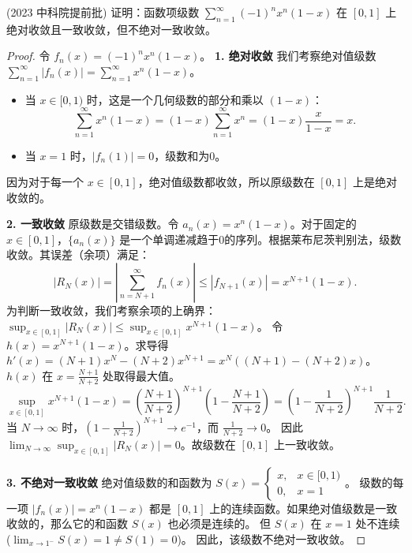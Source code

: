 \documentclass[lang=cn,10pt,thmcnt=section]{elegantbook}
\begin{document}
	
	\begin{example}
	(2023 中科院提前批) 证明：函数项级数 $\sum_{n=1}^{\infty} (-1)^n x^n (1-x)$ 在 $[0,1]$ 上绝对收敛且一致收敛，但不绝对一致收敛。
	\end{example}
	\begin{proof}
		令 $f_n(x) = (-1)^n x^n (1-x)$。
		\textbf{1. 绝对收敛}
		我们考察绝对值级数 $\sum_{n=1}^\infty |f_n(x)| = \sum_{n=1}^\infty x^n(1-x)$。
		\begin{itemize}
			\item 当 $x \in [0,1)$ 时，这是一个几何级数的部分和乘以 $(1-x)$：
			\[ \sum_{n=1}^\infty x^n(1-x) = (1-x) \sum_{n=1}^\infty x^n = (1-x) \frac{x}{1-x} = x. \]
			\item 当 $x=1$ 时，$|f_n(1)| = 0$，级数和为0。
		\end{itemize}
		因为对于每一个 $x \in [0,1]$，绝对值级数都收敛，所以原级数在 $[0,1]$ 上是绝对收敛的。
	
		\textbf{2. 一致收敛}
		原级数是交错级数。令 $a_n(x) = x^n(1-x)$。对于固定的 $x \in [0,1]$，$\{a_n(x)\}$ 是一个单调递减趋于0的序列。根据莱布尼茨判别法，级数收敛。其误差（余项）满足：
		\[ |R_N(x)| = \left| \sum_{n=N+1}^\infty f_n(x) \right| \le |f_{N+1}(x)| = x^{N+1}(1-x). \]
		为判断一致收敛，我们考察余项的上确界：$\sup_{x \in [0,1]} |R_N(x)| \le \sup_{x \in [0,1]} x^{N+1}(1-x)$。
		令 $h(x) = x^{N+1}(1-x)$。求导得 $h'(x) = (N+1)x^N - (N+2)x^{N+1} = x^N((N+1)-(N+2)x)$。
		$h(x)$ 在 $x = \frac{N+1}{N+2}$ 处取得最大值。
		\[ \sup_{x \in [0,1]} x^{N+1}(1-x) = \left(\frac{N+1}{N+2}\right)^{N+1} \left(1-\frac{N+1}{N+2}\right) = \left(1-\frac{1}{N+2}\right)^{N+1} \frac{1}{N+2}. \]
		当 $N \to \infty$ 时，$\left(1-\frac{1}{N+2}\right)^{N+1} \to e^{-1}$，而 $\frac{1}{N+2} \to 0$。
		因此 $\lim_{N \to \infty} \sup_{x \in [0,1]} |R_N(x)| = 0$。故级数在 $[0,1]$ 上一致收敛。
	
		\textbf{3. 不绝对一致收敛}
		绝对值级数的和函数为 $S(x) = \begin{cases} x, & x \in [0,1) \\ 0, & x=1 \end{cases}$。
		级数的每一项 $|f_n(x)|=x^n(1-x)$ 都是 $[0,1]$ 上的连续函数。如果绝对值级数是一致收敛的，那么它的和函数 $S(x)$ 也必须是连续的。
		但 $S(x)$ 在 $x=1$ 处不连续 ($\lim_{x\to 1^-} S(x) = 1 \neq S(1)=0$)。
		因此，该级数不绝对一致收敛。
	\end{proof}
	
\end{document}
